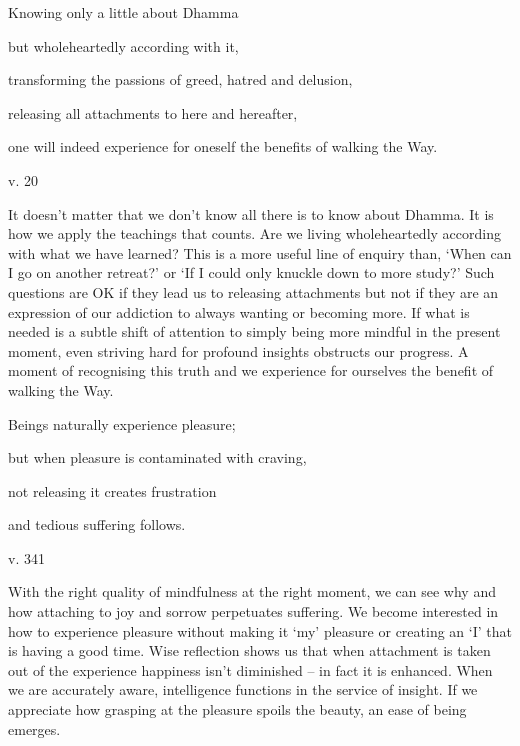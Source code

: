 \documentclass[a4paper,portrait,12pt]{article}
\begin{document}
Knowing only a little about Dhamma


but wholeheartedly according with it,


transforming the passions of greed, hatred and delusion,


releasing all attachments to here and hereafter,


one will indeed experience for oneself the benefits of walking the Way.





v. 20





It doesn't matter that we don't know all there is to know about Dhamma. It is how we apply the teachings that counts. Are we living wholeheartedly according with what we have learned? This is a more useful line of enquiry than, `When can I go on another retreat?' or `If I could only knuckle down to more study?' Such questions are OK if they lead us to releasing attachments but not if they are an expression of our addiction to always wanting or becoming more. If what is needed is a subtle shift of attention to simply being more mindful in the present moment, even striving hard for profound insights obstructs our progress. A moment of recognising this truth and we experience for ourselves the benefit of walking the Way.














Beings naturally experience pleasure;


but when pleasure is contaminated with craving,


not releasing it creates frustration 


and tedious suffering follows.





v. 341





With the right quality of mindfulness at the right moment, we can see why and how attaching to joy and sorrow perpetuates suffering. We become interested in how to experience pleasure without making it `my' pleasure or creating an `I' that is having a good time. Wise reflection shows us that when attachment is taken out of the experience happiness isn't diminished -- in fact it is enhanced. When we are accurately aware, intelligence functions in the service of insight. If we appreciate how grasping at the pleasure spoils the beauty, an ease of being emerges.
\end{document}
